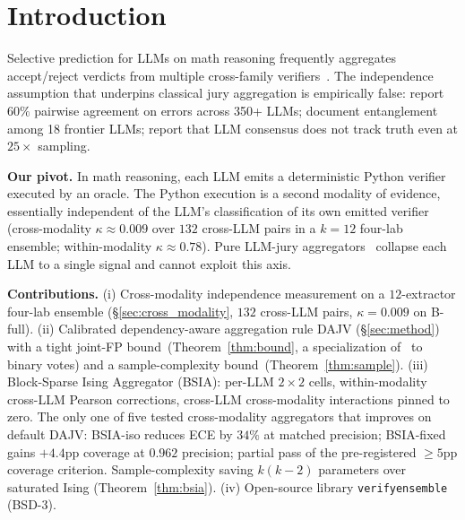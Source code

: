 \section{Introduction}
\label{sec:introduction}

Selective prediction for LLMs on math reasoning frequently aggregates
accept/reject verdicts from multiple cross-family
verifiers~\citep{kuhn2023semantic,lightman2024prm,dtv2024,kim2025correlated}.
The independence assumption that underpins classical jury aggregation
is empirically false: \citet{kim2025correlated} report $60\%$
pairwise agreement on errors across 350+ LLMs;
\citet{kuai2026independence} document entanglement among 18 frontier
LLMs; \citet{denisovblanch2026consensus} report that LLM consensus
does not track truth even at $25\times$ sampling.

\textbf{Our pivot.} In math reasoning, each LLM emits a deterministic
Python verifier executed by an oracle. The Python execution is a
second modality of evidence, essentially independent of the LLM's
classification of its own emitted verifier (cross-modality
$\kappa \approx 0.009$ over $132$ cross-LLM pairs in a $k=12$
four-lab ensemble; within-modality $\kappa \approx 0.78$). Pure
LLM-jury aggregators~\citep{kuai2026independence,zhao2026care,balasubramanian2026ising}
collapse each LLM to a single signal and cannot exploit this axis.

\textbf{Contributions.}
(i) Cross-modality independence measurement on a $12$-extractor
four-lab ensemble (\S\ref{sec:cross_modality}, $132$ cross-LLM
pairs, $\kappa = 0.009$ on B-full).
(ii) Calibrated dependency-aware aggregation rule DAJV
(\S\ref{sec:method}) with a tight joint-FP
bound~(Theorem~\ref{thm:bound}, a specialization
of~\citet{balasubramanian2026ising} to binary votes) and a
sample-complexity bound~(Theorem~\ref{thm:sample}).
(iii) Block-Sparse Ising Aggregator (BSIA): per-LLM
$2 \!\times\! 2$ cells, within-modality cross-LLM Pearson
corrections, cross-LLM cross-modality interactions pinned to zero.
The only one of five tested cross-modality aggregators that
improves on default DAJV: BSIA-iso reduces ECE by $34\%$ at matched
precision; BSIA-fixed gains $+4.4$pp coverage at $0.962$
precision; partial pass of the pre-registered $\geq 5$pp coverage
criterion. Sample-complexity saving $k(k-2)$ parameters over
saturated Ising (Theorem~\ref{thm:bsia}).
(iv) Open-source library \texttt{verifyensemble} (BSD-3).
